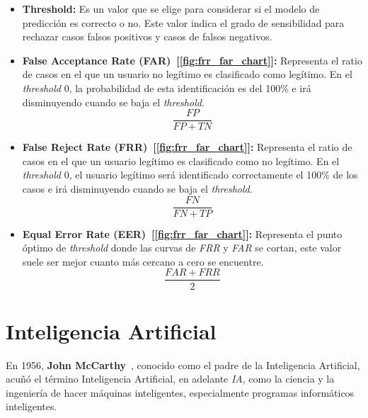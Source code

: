 \begin{itemize}
          \item \textbf{Threshold:} Es un valor que se elige para considerar si el modelo de predicción es correcto o no. Este valor indica el grado de sensibilidad para rechazar casos falsos positivos y casos de falsos negativos.

          \item \textbf{False Acceptance Rate (FAR)~[\cref{fig:frr_far_chart}]:} Representa el ratio de casos en el que un usuario no legítimo es clasificado como legítimo. En el \textit{threshold} 0, la probabilidad de esta identificación es del 100\% e irá disminuyendo cuando se baja el \textit{threshold}.
          \begin{equation}
              \frac{FP}{FP+TN}
          \end{equation}

          \item \textbf{False Reject Rate (FRR)~[\cref{fig:frr_far_chart}]:} Representa el ratio de casos en el que un usuario legítimo es clasificado como no legítimo. En el \textit{threshold} 0, el usuario legítimo será identificado correctamente el 100\% de los casos e irá disminuyendo cuando se baja el \textit{threshold}.
          \begin{equation}
              \frac{FN}{FN+TP}
          \end{equation}
          
          \item \textbf{Equal Error Rate (EER)~[\cref{fig:frr_far_chart}]:} Representa el punto óptimo de \textit{threshold} donde las curvas de \textit{FRR} y \textit{FAR} se cortan, este valor suele ser mejor cuanto más cercano a cero se encuentre.
              \begin{equation}
                  \frac{FAR + FRR}{2}
              \end{equation}

\end{itemize}


\section{Inteligencia Artificial}

En 1956, \textbf{John McCarthy}~\cite{mccarthy2007artificial}, conocido como el padre de la Inteligencia Artificial, acuñó el término Inteligencia Artificial, en adelante \textit{IA}, como la ciencia y la ingeniería de hacer máquinas inteligentes, especialmente programas informáticos inteligentes.

